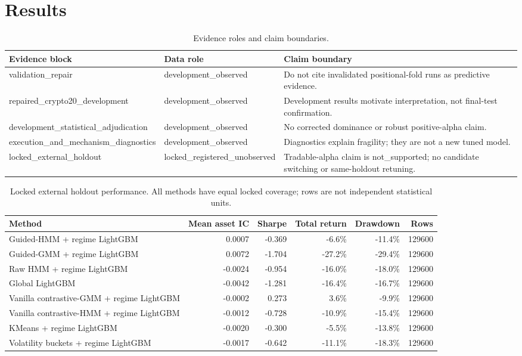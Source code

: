 \documentclass[sigconf,anonymous,review]{acmart}
\begin{document}
\section{Results}
\begin{table}[t]
\caption{Evidence roles and claim boundaries.}
\label{tab:evidence-boundaries}
\begin{tabular}{lll}
\toprule
Evidence block & Data role & Claim boundary \\
\midrule
validation\_repair & development\_observed & Do not cite invalidated positional-fold runs as predictive evidence. \\
repaired\_crypto20\_development & development\_observed & Development results motivate interpretation, not final-test confirmation. \\
development\_statistical\_adjudication & development\_observed & No corrected dominance or robust positive-alpha claim. \\
execution\_and\_mechanism\_diagnostics & development\_observed & Diagnostics explain fragility; they are not a new tuned model. \\
locked\_external\_holdout & locked\_registered\_unobserved & Tradable-alpha claim is not\_supported; no candidate switching or same-holdout retuning. \\
\bottomrule
\end{tabular}
\end{table}

\begin{table}[t]
\caption{Locked external holdout performance. All methods have equal locked coverage; rows are not independent statistical units.}
\label{tab:locked-results}
\begin{tabular}{lrrrrr}
\toprule
Method & Mean asset IC & Sharpe & Total return & Drawdown & Rows \\
\midrule
Guided-HMM + regime LightGBM & 0.0007 & -0.369 & -6.6\% & -11.4\% & 129600 \\
Guided-GMM + regime LightGBM & 0.0072 & -1.704 & -27.2\% & -29.4\% & 129600 \\
Raw HMM + regime LightGBM & -0.0024 & -0.954 & -16.0\% & -18.0\% & 129600 \\
Global LightGBM & -0.0042 & -1.281 & -16.4\% & -16.7\% & 129600 \\
Vanilla contrastive-GMM + regime LightGBM & -0.0002 & 0.273 & 3.6\% & -9.9\% & 129600 \\
Vanilla contrastive-HMM + regime LightGBM & -0.0012 & -0.728 & -10.9\% & -15.4\% & 129600 \\
KMeans + regime LightGBM & -0.0020 & -0.300 & -5.5\% & -13.8\% & 129600 \\
Volatility buckets + regime LightGBM & -0.0017 & -0.642 & -11.1\% & -18.3\% & 129600 \\
\bottomrule
\end{tabular}
\end{table}
\end{document}
